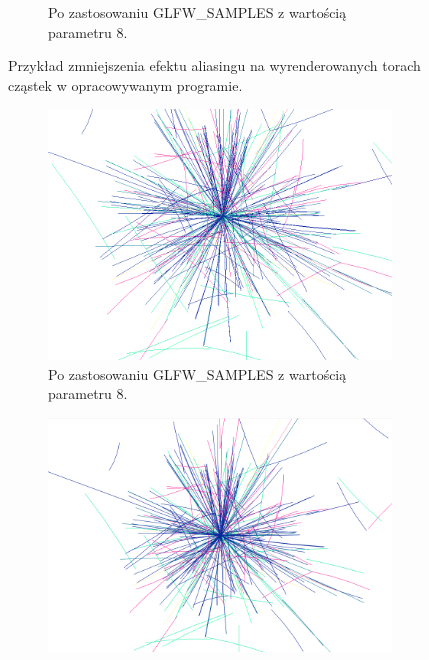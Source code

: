 \begin{figure}[H]
\begin{subfigure}{0.45\textwidth}
    	\caption{Po zastosowaniu GLFW\_SAMPLES z wartością parametru 8.}
		\label{rys12}
	\end{subfigure}
    \caption{Przykład zmniejszenia efektu aliasingu na wyrenderowanych torach cząstek w opracowywanym programie.}
    \label{rys13}
\end{figure}

\begin{figure}[H]
	\begin{subfigure}{0.5\textwidth}
		\centering
 		\includegraphics[width=\textwidth]{WithAliasingDuzo.png}
    	\caption{Po zastosowaniu GLFW\_SAMPLES z wartością parametru 8.}
 		\label{rys15}
	\end{subfigure}
	\hfill
	\begin{subfigure}{0.5\textwidth}
		\centering
		\includegraphics[width=\textwidth]{AntialiasingDuzo.png}

\end{subfigure}
\end{figure}
